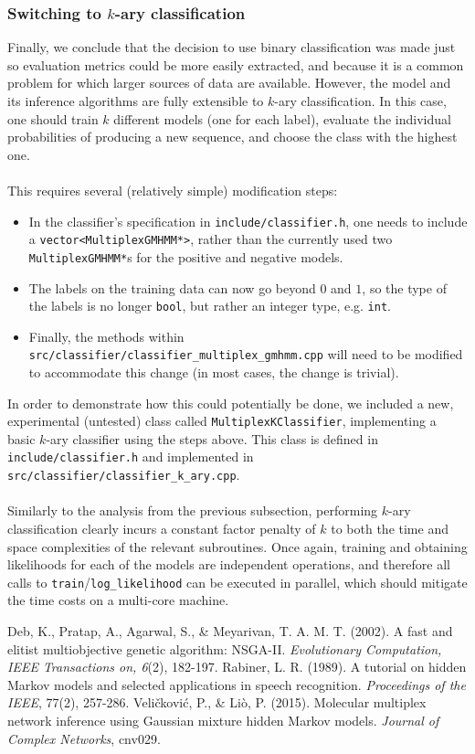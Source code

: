 \documentclass[12pt,openany]{article}
\begin{document}
	\subsubsection{Switching to $k$-ary classification}\label{sec:kary}
	Finally, we conclude that the decision to use binary classification was made just so evaluation metrics could be more easily extracted, and because it is a common problem for which larger sources of data are available. However, the model and its inference algorithms are fully extensible to $k$-ary classification. In this case, one should train $k$ different models (one for each label), evaluate the individual probabilities of producing a new sequence, and choose the class with the highest one.\\ \\
	This requires several (relatively simple) modification steps:
	\begin{itemize}
		\item In the classifier's specification in {\tt include/classifier.h}, one needs to include a {\tt vector<MultiplexGMHMM*>}, rather than the currently used two {\tt MultiplexGMHMM*}s for the positive and negative models.
		\item The labels on the training data can now go beyond $0$ and $1$, so the type of the labels is no longer {\tt bool}, but rather an integer type, e.g. {\tt int}.
		\item Finally, the methods within {\tt src/classifier/classifier\_multiplex\_gmhmm.cpp} will need to be modified to accommodate this change (in most cases, the change is trivial).
	\end{itemize}
	In order to demonstrate how this could potentially be done, we included a new, experimental (untested) class called {\tt MultiplexKClassifier}, implementing a basic $k$-ary classifier using the steps above. This class is defined in {\tt include/classifier.h} and implemented in {\tt src/classifier/classifier\_k\_ary.cpp}.\\ \\
	Similarly to the analysis from the previous subsection, performing $k$-ary classification clearly incurs a constant factor penalty of $k$ to both the time and space complexities of the relevant subroutines. Once again, training and obtaining likelihoods for each of the models are independent operations, and therefore all calls to {\tt train}/{\tt log\_likelihood} can be executed in parallel, which should mitigate the time costs on a multi-core machine.
	\begin{thebibliography}{9}
 Deb, K., Pratap, A., Agarwal, S., \& Meyarivan, T. A. M. T. (2002). A fast and elitist multiobjective genetic algorithm: NSGA-II. \emph{Evolutionary Computation, IEEE Transactions on, 6}(2), 182-197.
 Rabiner, L. R. (1989). A tutorial on hidden Markov models and selected applications in speech recognition. \emph{Proceedings of the IEEE}, 77(2), 257-286.
 Veli\v{c}kovi\'{c}, P., \& Li\`{o}, P. (2015). Molecular multiplex network inference using Gaussian mixture hidden Markov models. \emph{Journal of Complex Networks}, cnv029.
\end{thebibliography}
	
\end{document}
